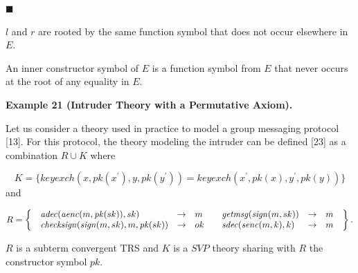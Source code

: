  
\par\noindent  $\blacksquare$ 
 
$l$ and $r$ are rooted by the same function symbol that does not occur elsewhere in $E$.\par
 
 
  
An inner constructor symbol of $E$ is a function symbol from $E$ that never occurs at the root of any equality in $E$.\par
 
 
 
 
\par\medskip\noindent\textbf{Example 21 (Intruder Theory with a Permutative Axiom).}\par
 
 
Let us consider a theory used in practice to model a group messaging protocol [13]. For this protocol, the theory modeling the intruder can be defined [23] as a combination $R\cup K$ where\par
    \[K=\{\mathit{keyexch}(x,\mathit{pk}(x^{\prime}),y,\mathit{pk}(y^{\prime}))=%
\mathit{keyexch}(x^{\prime},\mathit{pk}(x),y^{\prime},\mathit{pk}(y))\}\]    
and\par
    \[R=\left\{\begin{array}[]{ll}\begin{array}[]{lcl}\mathit{adec}(\mathit{aenc}(m,%
\mathit{pk}(sk)),sk)&\rightarrow&m\\
\mathit{checksign}(\mathit{sign}(m,sk),m,\mathit{pk}(sk))&\rightarrow&ok\end{%
array}&\begin{array}[]{lcl}\mathit{getmsg}(\mathit{sign}(m,sk))&\rightarrow&m%
\\
\mathit{sdec}(\mathit{senc}(m,k),k)&\rightarrow&m\end{array}\end{array}\right\}.\]    
 
 
$R$ is a subterm convergent TRS and $K$ is a $\mathit{SVP}$ theory sharing with $R$ the constructor symbol $\mathit{pk}$.\par
 
 
 
